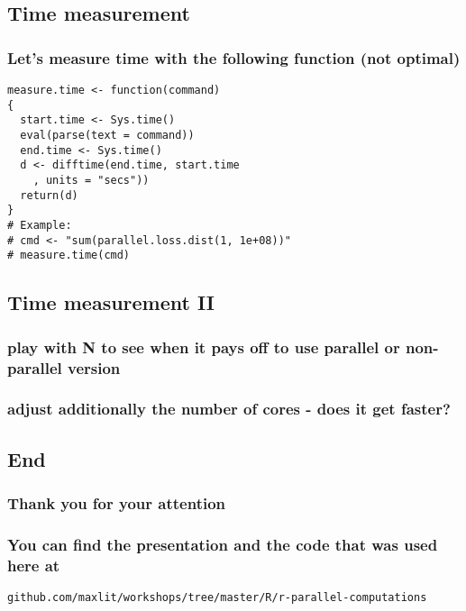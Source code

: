 \documentclass[bigger]{beamer}
\begin{document}
\subsection{Time measurement}
\label{sec-3-16}
\subsubsection{Let's measure time with the following function (not optimal)}
\label{sec-3-16-1}
\begin{verbatim}
measure.time <- function(command)
{
  start.time <- Sys.time()
  eval(parse(text = command))
  end.time <- Sys.time()
  d <- difftime(end.time, start.time
	, units = "secs"))
  return(d)
}
# Example:
# cmd <- "sum(parallel.loss.dist(1, 1e+08))"
# measure.time(cmd)
\end{verbatim}

\subsection{Time measurement II}
\label{sec-3-17}
\subsubsection{play with N to see when it pays off to use parallel or non-parallel version}
\label{sec-3-17-1}
\subsubsection{adjust additionally the number of cores - does it get faster?}
\label{sec-3-17-2}
\subsection{End}
\label{sec-3-18}
\subsubsection{Thank you for your attention}
\label{sec-3-18-1}
\subsubsection{You can find the presentation and the code that was used here at}
\label{sec-3-18-2}
\texttt{github.com/maxlit/workshops/tree/master/R/r-parallel-computations}
\end{document}
